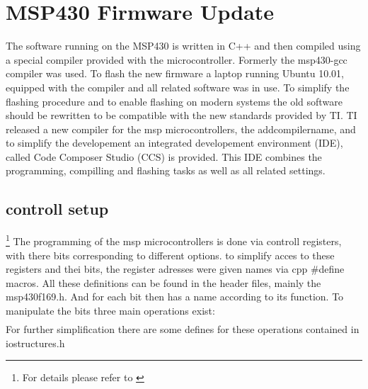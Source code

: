 
\chapter{MSP430 Firmware Update}
\label{sec:Software}
The software running on the MSP430 is written in C++ and then compiled using a special compiler provided with the microcontroller. Formerly the msp430-gcc compiler was used. To flash the new firmware a laptop running Ubuntu 10.01, equipped with the compiler and all related software was in use.
To simplify the flashing procedure and to enable flashing on modern systems the old software should be rewritten to be compatible with the new standards provided by TI.
TI released a new compiler for the msp microcontrollers, the addcompilername, and to simplify the developement an integrated developement environment (IDE), called Code Composer Studio (CCS) is provided. This IDE combines the programming, compilling and flashing tasks as well as all related settings.

\section{controll setup}\footnote{For details please refer to \cite{msp_manual}}
The programming of the msp microcontrollers is done via controll registers, with there bits corresponding to different options. to simplify acces to these registers and thei bits, the register adresses were given names via cpp \#define macros. All these definitions can be found in the header files, mainly the msp430f169.h. And for each bit then has a name according to its function. To manipulate the bits three main operations exist:
\begin{align}
\end{align} 
For further simplification there are some defines for these operations contained in iostructures.h


